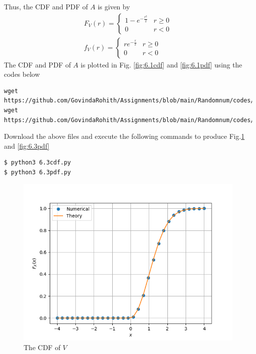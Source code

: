 \documentclass[journal,12pt,twocolumn]{IEEEtran}
\renewcommand\thesection{\arabic{section}}
\begin{document}
\begin{enumerate}[label=\thesection.\arabic*
,ref=\thesection.\theenumi]
\begin{enumerate}[label=\thesection.\arabic*
,ref=\thesection.\theenumi]
Thus, the CDF and PDF of $A$ is given by
\begin{align}
	F_V(r) = 
	\begin{cases}
		1 - e^{-\frac{r^2}{2}} & r \geq 0 \\
		0 & r < 0 
	\end{cases} \label{eq:ral-cdf} \\
	f_V(r) = 
	\begin{cases}
		re^{-\frac{r}{2}} & r \geq 0 \\
		0 & r < 0
	\end{cases} \label{eq:ral-pdf} 
\end{align}
The CDF and PDF of $A$ is plotted in Fig. \ref{fig:6.1cdf} and \ref{fig:6.1pdf} using the codes below
\begin{lstlisting}
wget https://github.com/GovindaRohith/Assignments/blob/main/Randomnum/codes/6.3cdf.py
wget https://github.com/GovindaRohith/Assignments/blob/main/Randomnum/codes/6.3pdf.py
\end{lstlisting}
Download the above files and execute the following commands to produce Fig.\ref{fig:6.3cdf} and \ref{fig:6.3pdf}
\begin{lstlisting}
$ python3 6.3cdf.py
$ python3 6.3pdf.py
\end{lstlisting}
\begin{figure}[!h]
\centering
\includegraphics[width=\columnwidth]{./figs/6.3cdf.png}
\caption{The CDF of $V$}
\label{fig:6.3cdf}
\end{figure}
\begin{figure}[!h]
\centering

\end{figure}
\end{enumerate}
\end{enumerate}
\end{document}
